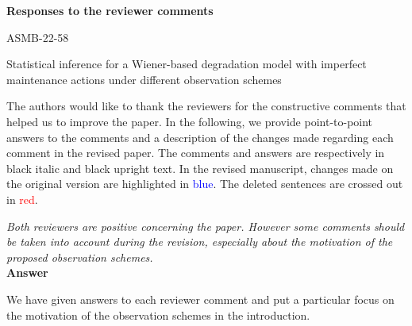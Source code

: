 



\begin{center}

{\LARGE \bf Responses to the reviewer comments

\vspace{2mm}

ASMB-22-58 

\vspace{2mm}

Statistical inference for a Wiener-based degradation model with imperfect maintenance actions under different observation schemes}

\end{center}

\vspace{5mm}

The authors would like to thank the reviewers for the constructive comments that helped
us to improve the paper. In the following, we provide point-to-point answers to the comments and a description of the changes made regarding each comment in the revised paper.
The comments and answers are respectively in black italic and black upright text. In the revised manuscript, changes made on the original version are highlighted in \textcolor{blue}{blue}. The deleted sentences are crossed out in \textcolor{red}{red}. %

\vspace{1cm}


{\it Both reviewers are positive concerning the paper. However some comments should be taken into account during the revision, especially about the motivation of the proposed observation schemes.}\\

{\bf Answer}

We have given answers to each reviewer comment and put a particular focus on the motivation of the observation schemes in the introduction.\\

\vspace{1cm}


